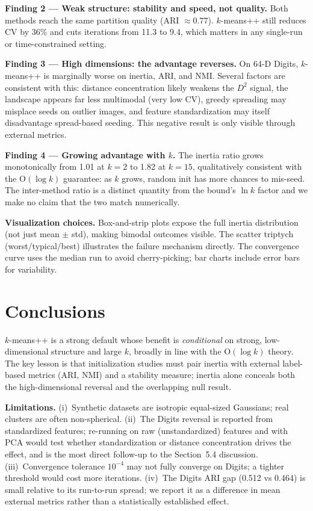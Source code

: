 \documentclass[11pt,a4paper]{article}
\begin{document}
\textbf{Finding 2 — Weak structure: stability and speed, not quality.}
Both methods reach the same partition quality (ARI $\approx0.77$). $k$-means++ still
reduces CV by 36\% and cuts iterations from 11.3 to 9.4, which matters in any
single-run or time-constrained setting.

\textbf{Finding 3 — High dimensions: the advantage reverses.}
On 64-D Digits, $k$-means++ is marginally worse on inertia, ARI, and NMI. Several factors
are consistent with this: distance concentration likely weakens the $D^2$ signal, the
landscape appears far less multimodal (very low CV), greedy spreading may misplace seeds
on outlier images, and feature standardization may itself disadvantage spread-based seeding.
This negative result is only visible through external metrics.

\textbf{Finding 4 — Growing advantage with $k$.}
The inertia ratio grows monotonically from 1.01 at $k=2$ to 1.82 at $k=15$, qualitatively
consistent with the O$(\log k)$ guarantee: as $k$ grows, random init has more chances to
mis-seed. The inter-method ratio is a distinct quantity from the bound's $\ln k$ factor and
we make no claim that the two match numerically.

\textbf{Visualization choices.} Box-and-strip plots expose the full inertia distribution
(not just mean $\pm$ std), making bimodal outcomes visible. The scatter triptych (worst/typical/best)
illustrates the failure mechanism directly. The convergence curve uses the median run to
avoid cherry-picking; bar charts include error bars for variability.

\section{Conclusions}

$k$-means++ is a strong default whose benefit is \emph{conditional} on strong,
low-dimensional structure and large $k$, broadly in line with the O$(\log k)$ theory.
The key lesson is that initialization studies must pair inertia with external
label-based metrics (ARI, NMI) and a stability measure; inertia alone conceals
both the high-dimensional reversal and the overlapping null result.

\textbf{Limitations.}
(i)~Synthetic datasets are isotropic equal-sized Gaussians; real clusters are often non-spherical.
(ii)~The Digits reversal is reported from standardized features; re-running on raw (unstandardized)
features and with PCA would test whether standardization or distance concentration drives the effect,
and is the most direct follow-up to the Section~5.4 discussion.
(iii)~Convergence tolerance $10^{-4}$ may not fully converge on Digits; a tighter threshold
would cost more iterations.
(iv)~The Digits ARI gap (0.512 vs 0.464) is small relative to its run-to-run spread; we report
it as a difference in mean external metrics rather than a statistically established effect.
\end{document}
